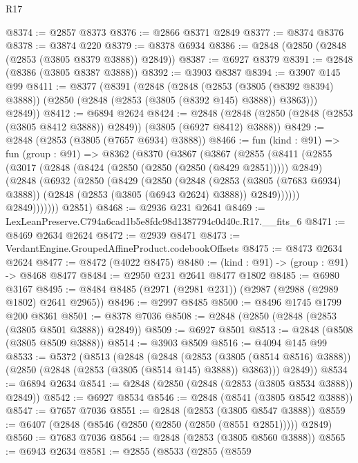 \begin{lexlean}{R17}
\begin{coremodule}
@8374 := @2857 @8373
@8376 := @2866 @8371 @2849
@8377 := @8374 @8376
@8378 := @3874 @220
@8379 := @8378 @6934
@8386 := @2848 (@2850 (@2848 (@2853 (@3805 @8379 @3888)) @2849))
@8387 := @6927 @8379
@8391 := @2848 (@8386 (@3805 @8387 @3888))
@8392 := @3903 @8387
@8394 := @3907 @145 @99
@8411 := @8377
    (@8391
      (@2848
        (@2848
          (@2853 (@3805 (@8392 @8394) @3888))
          (@2850 (@2848 (@2853 (@3805 (@8392 @145) @3888)) @3863)))
        @2849))
@8412 := @6894 @2624
@8424 := @2848 (@2848 (@2850 (@2848 (@2853 (@3805 @8412 @3888)) @2849)) (@3805 (@6927 @8412) @3888))
@8429 := @2848 (@2853 (@3805 (@7657 @6934) @3888))
@8466 := fun (kind : @91) =>
  fun (group : @91) =>
  @8362
    (@8370
      (@3867
        (@3867
          (@2855
            (@8411
              (@2855
                (@3017
                  (@2848 (@8424 (@2850 (@2850 (@2850 (@8429 @2851))))) @2849)
                  (@2848
                    (@6932
                      (@2850
                        (@8429
                          (@2850
                            (@2848
                              (@2853 (@3805 (@7683 @6934) @3888))
                              (@2848 (@2853 (@3805 (@6943 @2624) @3888)) @2849))))))
                    @2849)))))))
      @2851)
@8468 := @2936 @231 @2641
@8469 := LexLeanPreserve.C794a6cad1b5e8fdc98d1387794c0d40c.R17.__fits_6
@8471 := @8469 @2634 @2624
@8472 := @2939 @8471
@8473 := VerdantEngine.GroupedAffineProduct.codebookOffsets
@8475 := @8473 @2634 @2624
@8477 := @8472 (@4022 @8475)
@8480 := (kind : @91) -> (group : @91) -> @8468 @8477
@8484 := @2950 @231 @2641 @8477 @1802
@8485 := @6980 @3167
@8495 := @8484 @8485 (@2971 (@2981 @231)) (@2987 (@2988 (@2989 @1802) @2641 @2965))
@8496 := @2997 @8485
@8500 := @8496 @1745 @1799 @200 @8361
@8501 := @8378 @7036
@8508 := @2848 (@2850 (@2848 (@2853 (@3805 @8501 @3888)) @2849))
@8509 := @6927 @8501
@8513 := @2848 (@8508 (@3805 @8509 @3888))
@8514 := @3903 @8509
@8516 := @4094 @145 @99
@8533 := @5372
    (@8513
      (@2848
        (@2848
          (@2853 (@3805 (@8514 @8516) @3888))
          (@2850 (@2848 (@2853 (@3805 (@8514 @145) @3888)) @3863)))
        @2849))
@8534 := @6894 @2634
@8541 := @2848 (@2850 (@2848 (@2853 (@3805 @8534 @3888)) @2849))
@8542 := @6927 @8534
@8546 := @2848 (@8541 (@3805 @8542 @3888))
@8547 := @7657 @7036
@8551 := @2848 (@2853 (@3805 @8547 @3888))
@8559 := @6407 (@2848 (@8546 (@2850 (@2850 (@2850 (@8551 @2851))))) @2849)
@8560 := @7683 @7036
@8564 := @2848 (@2853 (@3805 @8560 @3888))
@8565 := @6943 @2634
@8581 := @2855
    (@8533
      (@2855
        (@8559

\end{coremodule}
\end{lexlean}
